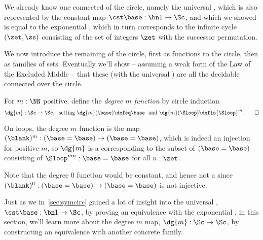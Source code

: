 We already know one connected \covering of the circle, namely the universal \covering, which is also represented by the constant map $\cst\base:\bn 1\to\Sc$, and which we showed is equal to the exponential \covering, which in turn corresponds to the infinite cycle $(\zet,\zs)$
consisting of the set of integers $\zet$ with the successor permutation.

We now introduce the remaining \coverings of the circle, first as functions to the circle, then as families of sets.
Eventually we'll show -- assuming a weak form
of the Law of the Excluded Middle -- that these (with the universal \covering)
are all the decidable connected \coverings over the circle.

\begin{definition}\label{def:mfoldS1cover}
For $m:\NN$ positive, define the \emph{degree $m$ function} by circle induction
\[
\dg{m}:\Sc\to \Sc, \text{~~setting~}
\dg{m}(\base)\defeq\base \text{~~and~}
\dg{m}(\Sloop)\defis{\Sloop}^m.\qedhere
\]
\end{definition}
On loops, the degree $m$ function is the map
$(\blank)^m : (\base=\base) \to (\base=\base)$,
which is indeed an injection for positive $m$,
so $\dg{m}$ is a \covering corresponding to the subset of $(\base=\base)$ consisting
of ${\Sloop}^{mn} : \base=\base$ for all $n:\zet$.

Note that the degree $0$ function would be constant,
and hence not a \covering since $(\blank)^0 : (\base=\base) \to (\base=\base)$
is not injective.

Just as we in~\cref{sec:symcirc} gained a lot of insight into the universal \covering,
$\cst\base:\bn 1\to\Sc$,
by proving an equivalence with the exponential \covering,
in this section, we'll learn more about the degree $m$ map,
$\dg{m}:\Sc\to\Sc$,
by constructing an equivalence with another concrete family.

